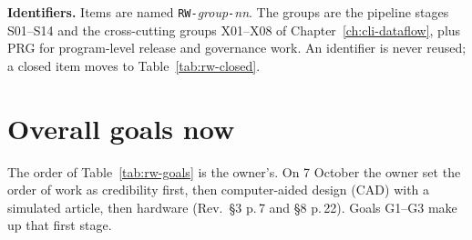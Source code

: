 \textbf{Identifiers.} Items are named \texttt{RW-}\emph{group}\texttt{-}\emph{nn}. The groups are the pipeline stages S01--S14 and the cross-cutting groups X01--X08 of Chapter~\ref{ch:cli-dataflow}, plus PRG for program-level release and governance work. An identifier is never reused; a closed item moves to Table~\ref{tab:rw-closed}.

\newcommand{\rwsmall}{\footnotesize\renewcommand{\code}[1]{\path{##1}}}

\section{Overall goals now}\label{sec:rw-goals}

The order of Table~\ref{tab:rw-goals} is the owner's. On 7 October the owner set the order of work as credibility first, then computer-aided design (CAD) with a simulated article, then hardware (Rev.\ \S3 p.\,7 and \S8 p.\,22). Goals G1--G3 make up that first stage.

